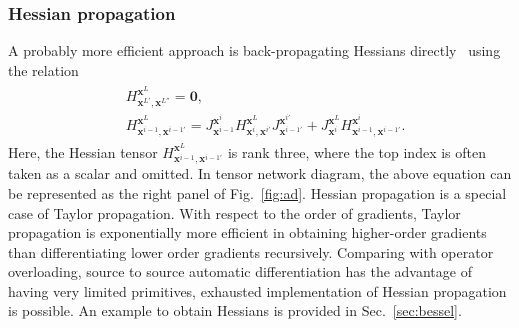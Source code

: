 \documentclass[aps,twocolumn,longbibliography,english,superscriptaddress]{revtex4-1}
\newcommand{\<}{\langle}
\renewcommand{\>}{\rangle}
\newcommand{\out}{{\vx^L}}
\newcommand{\vx}{{\mathbf{x}}}
\newcommand{\Fig}[1]{Fig.~\ref{#1}}
\newcommand{\Sec}[1]{Sec.~\ref{#1}}
\theoremstyle{definition}\newtheorem{definition}{\textit{Definition}}
\begin{document}
\subsubsection{Hessian propagation}\label{sec:taylor}
A probably more efficient approach is back-propagating Hessians directly~\cite{Martens2012} using the relation
\begin{align}
    \begin{split}
        &H^{\out}_{\vx^{L'},\vx^{L''}} = \mathbf{0},\\
        &H^{\out}_{\vx^{i-1},\vx^{i-1'}} = J^{\vx^i}_{\vx^{i-1}} H^{\out}_{\vx^i, \vx^{i'}} J^{\vx^{i'}}_{\vx^{i-1'}} + J^{\out}_{\vx^i} H^{\vx^i}_{\vx^{i-1}, \vx^{i-1'}}.
    \end{split}
\end{align}
Here, the Hessian tensor $H^{\out}_{\vx^{i-1},\vx^{i-1'}}$ is rank three, where the top index is often taken as a scalar and omitted.
In tensor network diagram, the above equation can be represented as the right panel of \Fig{fig:ad}.
Hessian propagation is a special case of Taylor propagation.
With respect to the order of gradients, Taylor propagation is exponentially more efficient in obtaining higher-order gradients than differentiating lower order gradients recursively. %
Comparing with operator overloading, source to source automatic differentiation has the advantage of having very limited primitives, exhausted implementation of Hessian propagation is possible.
An example to obtain Hessians is provided in \Sec{sec:bessel}.
\end{document}
